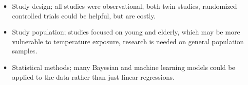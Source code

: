 \documentclass[plain, basic]{inVerba-notes}
\begin{document}
\begin{itemize}
\begin{itemize}
\begin{itemize}
          \begin{itemize}
            \item Study design; all studies were observational, both twin studies, randomized controlled trials could be helpful, but are costly.
            \item Study population; studies focused on young and elderly, which may be more vulnerable to temperature exposure, research is needed on general population samples.
            \item Statistical methods; many Bayesian and machine learning models could be applied to the data rather than just linear regressions. 
          \end{itemize}
      \end{itemize}
\end{itemize}

\end{itemize}

\nocite{xu2020environmental}


\end{document}
